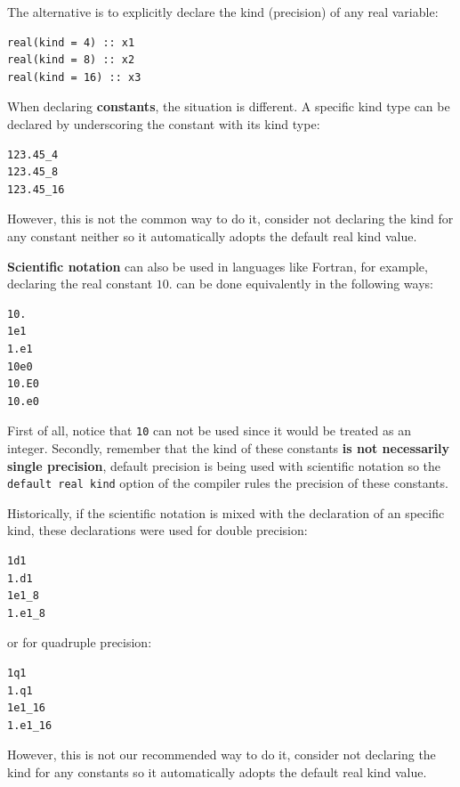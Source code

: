 The alternative is to explicitly declare the kind (precision) of any real variable: 
\begin{verbatim}
real(kind = 4) :: x1
real(kind = 8) :: x2
real(kind = 16) :: x3
\end{verbatim}

When declaring \textbf{constants}, the situation is different. A specific kind type can be declared
by underscoring the constant with its kind type:
\begin{verbatim}
123.45_4
123.45_8
123.45_16
\end{verbatim}
However, this is not the common way to do it, 
consider not declaring the kind for any constant neither so it automatically adopts the default real kind value.

\textbf{Scientific notation} can also be used in languages like Fortran, for example, declaring the real constant $10.$ can be done equivalently in the following ways:
\begin{verbatim}
10.
1e1
1.e1
10e0
10.E0
10.e0
\end{verbatim}
First of all, notice that \texttt{10} can not be used since it would be treated as an integer. 
Secondly, remember that the kind of these constants \textbf{is not necessarily single precision}, default precision is being used with scientific notation so the \texttt{default real kind} option of the compiler rules the precision of these constants.

Historically, if the scientific notation is mixed with the declaration of an specific kind, these declarations were used for double precision:
\begin{verbatim}
1d1
1.d1
1e1_8
1.e1_8
\end{verbatim}
or for quadruple precision:
\begin{verbatim}
1q1
1.q1
1e1_16
1.e1_16
\end{verbatim}
However, this is not our recommended way to do it, consider not declaring the kind for any constants so it automatically adopts the default real kind value.









